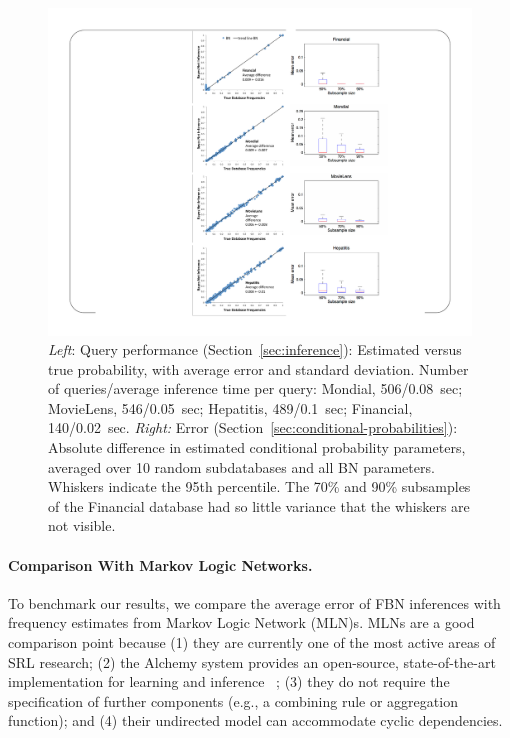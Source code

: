 \documentclass[oribibl]{llncs}
\begin{document}
\begin{figure}[hptb]
\begin{center}
\includegraphics{figures/inf-charts-vertical.pdf}
\end{center}
\caption{{\em Left}: Query performance (Section~\ref{sec:inference}): Estimated versus true probability, with average error and standard deviation. Number of queries/average inference time per query: Mondial, 506/0.08~sec; MovieLens, 546/0.05~sec; Hepatitis, 489/0.1~sec; Financial, 140/0.02~sec. 
{\em Right:} Error (Section~\ref{sec:conditional-probabilities}): Absolute difference in estimated conditional probability parameters, averaged over 10 random subdatabases and all BN parameters. 
%
Whiskers indicate the 95th percentile.
The 70\% and 90\% subsamples of the Financial database had so little variance that the whiskers are not visible. \label{fig:results}}
\end{figure}


\paragraph{Comparison With Markov Logic Networks.}

To benchmark our results, we compare the average error of FBN inferences with frequency estimates from Markov Logic Network (MLN)s. MLNs are a
good comparison point because (1) they are currently one of the most active areas of SRL research;  (2)  the Alchemy system provides an open-source, state-of-the-art implementation for learning and inference~ \cite{Kok2009a}; (3) they do not require the specification of further components (e.g., a combining rule or aggregation function); and (4) their undirected model can accommodate cyclic dependencies.
\end{document}
